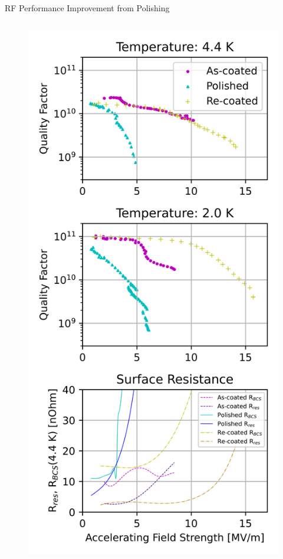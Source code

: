 \documentclass{beamer}
\begin{document}
\begin{frame}{}
\begin{columns}[t]
            \begin{column}{0.32\textwidth}
                \begin{block}{\label{sec:cavitycbp}RF Performance Improvement from Polishing}
                    \begin{columns}
                        \begin{column}{0.45\columnwidth}
                            \begin{figure}[t]
                                \centering
                                \includegraphics[width=\columnwidth]{../doc/figs/VTS_Test_Graph.png}%

\end{figure}
\end{column}
\end{columns}
\end{block}
\end{column}
\end{columns}
\end{frame}
\end{document}
